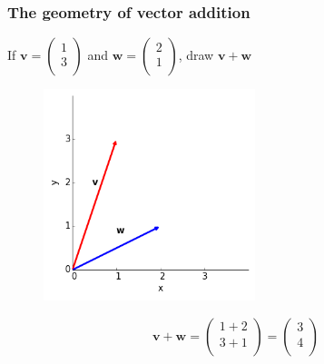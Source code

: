 \documentclass{beamer}
\begin{document}
\begin{frame}
\frametitle{The geometry of vector addition}
If 
	$\mathbf{v} = \left(
	\begin{array}{c}
	1\\
	3\\
	\end{array}
	\right)$ 
and 
	$\mathbf{w} = \left(
	\begin{array}{c}
	2\\
	1\\
	\end{array}
	\right)$, draw $\mathbf{v+w} $

\begin{figure}[htbp]
\begin{center}
 \includegraphics[width=0.55\textwidth]{figure2a.png}
\caption{}


\end{center}
\end{figure}

	
\end{frame}
\begin{frame}
$$\mathbf{v+w} = \left(
	\begin{array}{c}
	1+2\\
	3+1\\
	\end{array}
	\right) 
	= 
	\left(
	\begin{array}{c}
	3\\
	4\\
	\end{array}
	\right)$$\\



\end{frame}
\end{document}
